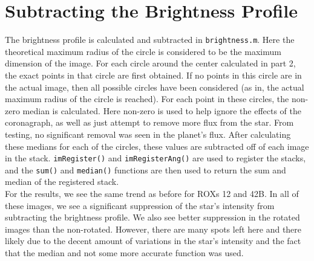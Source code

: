 \documentclass[12pt]{article}
\begin{document}
\section{Subtracting the Brightness Profile}
The brightness profile is calculated and subtracted in \texttt{brightness.m}. Here the theoretical maximum radius of the circle is considered to be the maximum dimension of the image. For each circle around the center calculated in part 2, the exact points in that circle are first obtained. If no points in this circle are in the actual image, then all possible circles have been considered (as in, the actual maximum radius of the circle is reached). For each point in these circles, the non-zero median is calculated. Here non-zero is used to help ignore the effects of the coronagraph, as well as just attempt to remove more flux from the star. From testing, no significant removal was seen in the planet's flux. After calculating these medians for each of the circles, these values are subtracted off of each image in the stack. \texttt{imRegister()} and \texttt{imRegisterAng()} are used to register the stacks, and the \texttt{sum()} and \texttt{median()} functions are then used to return the sum and median of the registered stack.\\
\indent For the results, we see the same trend as before for ROXs 12 and 42B. In all of these images, we see a significant suppression of the star's intensity from subtracting the brightness profile. We also see better suppression in the rotated images than the non-rotated. However, there are many spots left here and there likely due to the decent amount of variations in the star's intensity and the fact that the median and not some more accurate function was used.
\end{document}
